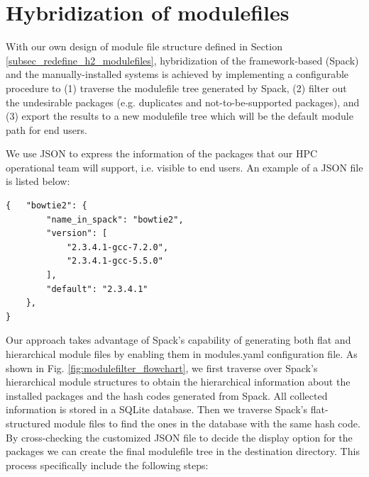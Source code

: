 \documentclass[conference]{IEEEtran}
\begin{document}
\section{Hybridization of modulefiles}\label{subsec_modulefile_processing}

With our own design of module file structure defined in Section \ref{subsec_redefine_h2_modulefiles}, hybridization of the framework-based (Spack) and the manually-installed systems is achieved by implementing a configurable procedure to (1) traverse the modulefile tree generated by Spack, (2) filter out the undesirable packages (e.g. duplicates and not-to-be-supported packages), and (3) export the results to a new modulefile tree which will be the default module path for end users.

We use JSON to express the information of the packages that our HPC operational team will support, i.e. visible to end users. An example of a JSON file is listed below:

{\small
\begin{verbatim}
{   "bowtie2": {
        "name_in_spack": "bowtie2",
        "version": [
            "2.3.4.1-gcc-7.2.0",
            "2.3.4.1-gcc-5.5.0"
        ],
        "default": "2.3.4.1"
    },
}
\end{verbatim}
}


Our approach takes advantage of Spack's capability of generating both flat and hierarchical module files by enabling them in modules.yaml configuration file. As shown in Fig. \ref{fig:modulefilter_flowchart}, we first traverse over Spack's hierarchical module structures to obtain the hierarchical information about the installed packages and the hash codes generated from Spack. All collected information is stored in a SQLite database. Then we traverse Spack's flat-structured module files to find the ones in the database with the same hash code. By cross-checking the customized JSON file to decide the display option for the packages we can create the final modulefile tree in the destination directory. This process specifically include the following steps:
\end{document}
